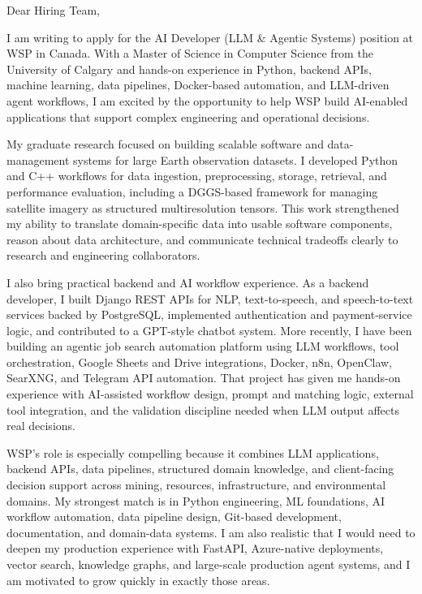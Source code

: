 \documentclass[11pt]{letter}
\begin{document}
\begin{letter}{}

\opening{Dear Hiring Team,}

I am writing to apply for the AI Developer (LLM \& Agentic Systems) position at WSP in Canada. With a Master of Science in Computer Science from the University of Calgary and hands-on experience in Python, backend APIs, machine learning, data pipelines, Docker-based automation, and LLM-driven agent workflows, I am excited by the opportunity to help WSP build AI-enabled applications that support complex engineering and operational decisions.

My graduate research focused on building scalable software and data-management systems for large Earth observation datasets. I developed Python and C++ workflows for data ingestion, preprocessing, storage, retrieval, and performance evaluation, including a DGGS-based framework for managing satellite imagery as structured multiresolution tensors. This work strengthened my ability to translate domain-specific data into usable software components, reason about data architecture, and communicate technical tradeoffs clearly to research and engineering collaborators.

I also bring practical backend and AI workflow experience. As a backend developer, I built Django REST APIs for NLP, text-to-speech, and speech-to-text services backed by PostgreSQL, implemented authentication and payment-service logic, and contributed to a GPT-style chatbot system. More recently, I have been building an agentic job search automation platform using LLM workflows, tool orchestration, Google Sheets and Drive integrations, Docker, n8n, OpenClaw, SearXNG, and Telegram API automation. That project has given me hands-on experience with AI-assisted workflow design, prompt and matching logic, external tool integration, and the validation discipline needed when LLM output affects real decisions.

WSP's role is especially compelling because it combines LLM applications, backend APIs, data pipelines, structured domain knowledge, and client-facing decision support across mining, resources, infrastructure, and environmental domains. My strongest match is in Python engineering, ML foundations, AI workflow automation, data pipeline design, Git-based development, documentation, and domain-data systems. I am also realistic that I would need to deepen my production experience with FastAPI, Azure-native deployments, vector search, knowledge graphs, and large-scale production agent systems, and I am motivated to grow quickly in exactly those areas.


\end{letter}
\end{document}
